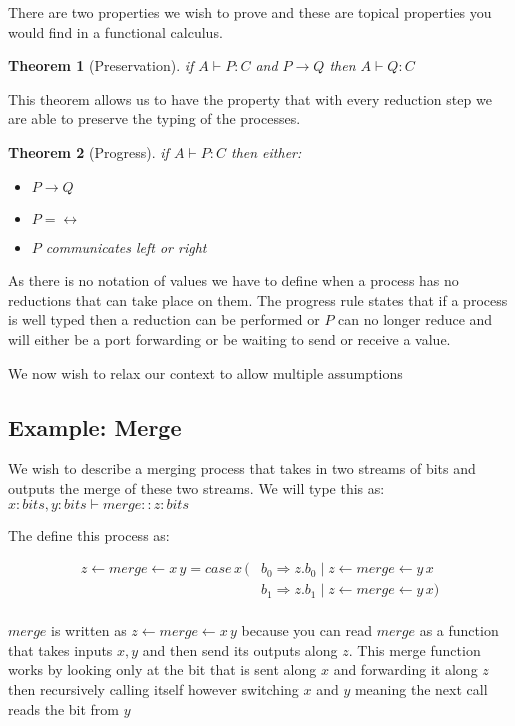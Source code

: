 \documentclass{article}
\newtheorem{theorem}{Theorem}
\begin{document}
There are two properties we wish to prove and these are topical properties you would find in a functional calculus.

\begin{theorem}[Preservation]
if \(A \vdash P : C\) and \(P \rightarrow Q\) then \( A \vdash Q:C \)
\end{theorem}


This theorem allows us to have the property that with every reduction step we are able to preserve the typing of the processes.

\begin{theorem}[Progress]
if \( A \vdash P:C \) then either:
\begin{itemize}
    \item \(P \rightarrow Q\)
    \item \( P = 	\leftrightarrow\)
    \item \( P\) communicates left or right
\end{itemize}
\end{theorem}
As there is no notation of values we have to define when a process has no reductions that can take place on them. The progress rule states that if a process is well typed then a reduction can be performed or \(P\) can no longer reduce and will either be a port forwarding or be waiting to send or receive a value. 


We now wish to relax our context to allow multiple assumptions

\subsection{Example: Merge}

We wish to describe a merging process that takes in two streams of bits and outputs the merge of these two streams. We will type this as:
\(x : bits , y : bits \vdash merge :: z : bits\)

The define this process as:

\begin{equation*}
\begin{split}
z \leftarrow merge \leftarrow x \, y = case \, x \, ( &  b_0 \Rightarrow z.b_0 \mid z \leftarrow merge \leftarrow y \, x\\
 & b_1 \Rightarrow z.b_1 \mid z \leftarrow merge \leftarrow y \, x ) \\
\end{split}
\end{equation*}

\(merge\) is written as \(z \leftarrow merge \leftarrow x \, y \) because you can read \(merge\) as a function that takes inputs \(x, y\) and then send its outputs along \(z\). This merge function works by looking only at the bit that is sent along \(x\) and forwarding it along \(z\) then recursively calling itself however switching \(x\) and \(y\) meaning the next call reads the bit from \(y\)
\end{document}
